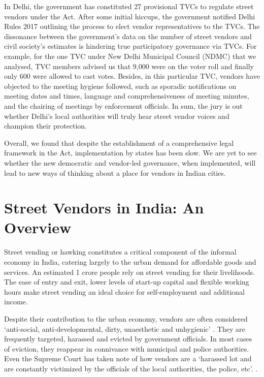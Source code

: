 \documentclass[a4paper, 12pt, twoside]{article}
\begin{document}
{In Delhi, the government has constituted 27 provisional TVCs to regulate street vendors under the Act. After some initial hiccups, the government notified Delhi Rules 2017 outlining the process to elect vendor representatives to the TVCs. The dissonance between the government’s data on the number of street vendors and civil society’s estimates is hindering true participatory governance via TVCs. For example, for the one TVC under New Delhi Municipal Council (NDMC) that we analysed, TVC members advised us that 9,000 were on the voter roll and finally only 600 were allowed to cast votes. Besides, in this particular TVC, vendors have objected to the meeting hygiene followed, such as sporadic notifications on meeting dates and times, language and comprehensiveness of meeting minutes, and the chairing of meetings by enforcement officials. In sum, the jury is out whether Delhi’s local authorities will truly hear street vendor voices and champion their protection. 

Overall, we found that despite the establishment of a comprehensive legal framework in the Act, implementation by states has been slow. We are yet to see whether the new democratic and vendor-led governance, when implemented, will lead to new ways of thinking about a place for vendors in Indian cities.

\newpage
\section*{Street Vendors in India: An Overview}
Street vending or hawking constitutes a critical component of the informal economy in India, catering largely to the urban demand for affordable goods and services. An estimated 1 crore people \parencite{jhapaper} rely on street vending for their livelihoods. The ease of entry and exit, lower levels of start-up capital and flexible working hours make street vending an ideal choice for self-employment and additional income. 

Despite their contribution to the urban economy, vendors are often considered `anti-social, anti-developmental, dirty, unaesthetic and unhygienic' \parencite{wiego}. They are frequently targeted, harassed and evicted by government officials. In most cases of eviction, they reappear in connivance with municipal and police authorities. Even the Supreme Court has taken note of how vendors are a `harassed lot and are constantly victimized by the officials of the local authorities, the police, etc'. \parencite{MEHU}.

}
\end{document}
